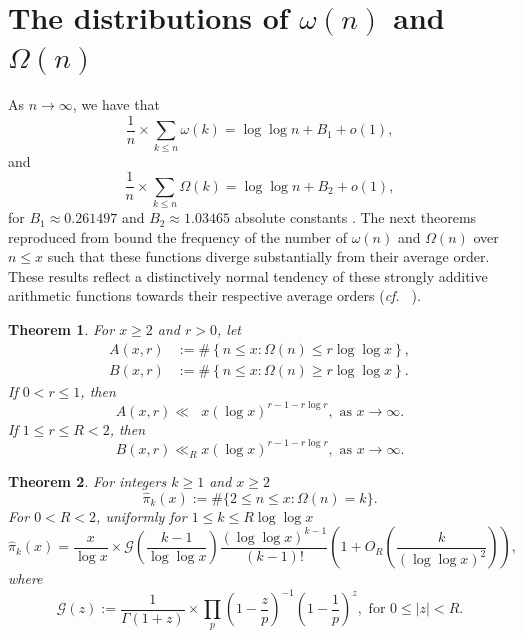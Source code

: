 \documentclass[11pt,reqno,a4letter]{article}
\numberwithin{equation}{section}
\numberwithin{figure}{section}
\numberwithin{table}{section}
\newcommand{\cf}{\textit{cf.\ }}
\theoremstyle{plain}
\newtheorem{theorem}{Theorem}
\numberwithin{theorem}{section}
\theoremstyle{definition}
\begin{document}
\section{The distributions of $\omega(n)$ and $\Omega(n)$} 
\label{subSection_TheKnownDistsOfThePrimeOmegaFunctions_IntroResults_v1} 

As $n \rightarrow \infty$, we have that 
$$\frac{1}{n} \times \sum_{k \leq n} \omega(k) = \log\log n + B_1 + o(1),$$ 
and 
$$\frac{1}{n} \times \sum_{k \leq n} \Omega(k) = \log\log n + B_2 + o(1),$$ for 
$B_1 \approx 0.261497$ and $B_2 \approx 1.03465$ 
absolute constants \cite[\S 22.10]{HARDYWRIGHT}. 
The next theorems reproduced from \cite[\S 7.4]{MV} bound the frequency of the 
number of $\omega(n)$ and $\Omega(n)$ over $n \leq x$ such that 
these functions diverge substantially from their average order. 
These results reflect a distinctively normal tendency 
of these strongly additive arithmetic functions towards their respective average orders 
(\cf \cite{ERDOS-KAC-REF,BILLINGSLY-CLT-PRIMEDIVFUNC} \cite[\S 7.4]{MV}). 

\begin{theorem} 
\label{theorem_MV_Thm7.20-init_stmt} 
For $x \geq 2$ and $r > 0$, let 
\begin{align*} 
A(x, r) & := \#\left\{n \leq x: \Omega(n) \leq r \log\log x\right\}, \\ 
B(x, r) & := \#\left\{n \leq x: \Omega(n) \geq r \log\log x\right\}. 
\end{align*} 
If $0 < r \leq 1$, then 
\[
A(x, r) \ll\phantom{_R} x (\log x)^{r-1 - r\log r}, \text{ as } x \rightarrow \infty. 
\]
If $1 \leq r \leq R < 2$, then 
\[
B(x, r) \ll_R x (\log x)^{r-1-r \log r}, \text{ as } x \rightarrow \infty. 
\]
\end{theorem} 

\begin{theorem}
\label{theorem_HatPi_ExtInTermsOfGz} 
For integers $k \geq 1$ and $x \geq 2$ 
$$\widehat{\pi}_k(x) := \#\{2 \leq n \leq x: \Omega(n)=k\}.$$ 
For $0 < R < 2$, uniformly for $1 \leq k \leq R \log\log x$ 
\[
\widehat{\pi}_k(x) = \frac{x}{\log x} \times \mathcal{G}\left(\frac{k-1}{\log\log x}\right) 
     \frac{(\log\log x)^{k-1}}{(k-1)!} \left(1 + O_R\left(\frac{k}{(\log\log x)^2}\right)\right), 
\]
where 
\[
\mathcal{G}(z) := \frac{1}{\Gamma(1+z)} \times 
	\prod_p \left(1-\frac{z}{p}\right)^{-1} \left(1-\frac{1}{p}\right)^z, 
	\text{ for } 0 \leq |z| < R. 
\]
\end{theorem} 
\end{document}
